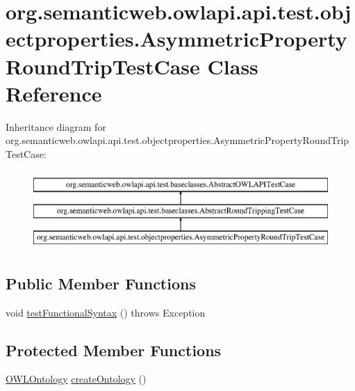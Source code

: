 \hypertarget{classorg_1_1semanticweb_1_1owlapi_1_1api_1_1test_1_1objectproperties_1_1_asymmetric_property_round_trip_test_case}{\section{org.\-semanticweb.\-owlapi.\-api.\-test.\-objectproperties.\-Asymmetric\-Property\-Round\-Trip\-Test\-Case Class Reference}
\label{classorg_1_1semanticweb_1_1owlapi_1_1api_1_1test_1_1objectproperties_1_1_asymmetric_property_round_trip_test_case}
}
Inheritance diagram for org.\-semanticweb.\-owlapi.\-api.\-test.\-objectproperties.\-Asymmetric\-Property\-Round\-Trip\-Test\-Case\-:\begin{figure}[H]
\begin{center}
\leavevmode
\includegraphics[height=3.000000cm]{classorg_1_1semanticweb_1_1owlapi_1_1api_1_1test_1_1objectproperties_1_1_asymmetric_property_round_trip_test_case}
\end{center}
\end{figure}
\subsection*{Public Member Functions}
\begin{DoxyCompactItemize}
\item 
void \hyperlink{classorg_1_1semanticweb_1_1owlapi_1_1api_1_1test_1_1objectproperties_1_1_asymmetric_property_round_trip_test_case_ab59228b19656ea1bdc6ed4c439cfe801}{test\-Functional\-Syntax} ()  throws Exception 
\end{DoxyCompactItemize}
\subsection*{Protected Member Functions}
\begin{DoxyCompactItemize}
\item 
\hyperlink{interfaceorg_1_1semanticweb_1_1owlapi_1_1model_1_1_o_w_l_ontology}{O\-W\-L\-Ontology} \hyperlink{classorg_1_1semanticweb_1_1owlapi_1_1api_1_1test_1_1objectproperties_1_1_asymmetric_property_round_trip_test_case_aff7f93482113c674fd0ffa7f59c66c65}{create\-Ontology} ()
\end{DoxyCompactItemize}


